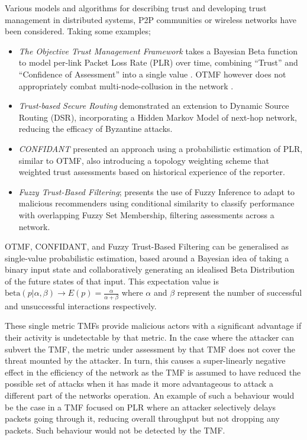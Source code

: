 \documentclass[runningheads,a4paper]{llncs}
\begin{document}
Various models and algorithms for describing trust and developing trust management in distributed systems, P2P communities or wireless networks have been considered.
Taking some examples;

\begin{itemize}
  \item \emph{The Objective Trust Management Framework} takes a Bayesian Beta function to model per-link Packet Loss Rate (PLR) over time, combining ``Trust'' and ``Confidence of Assessment'' into a single value \cite{Li2008}.
    OTMF however does not appropriately combat multi-node-collusion in the network \cite{Cho2011}.
  \item \emph{Trust-based Secure Routing}\cite{Moe2008a} demonstrated an extension to Dynamic Source Routing (DSR), incorporating a Hidden Markov Model of next-hop network, reducing the efficacy of Byzantine attacks.
  \item \emph{CONFIDANT}\cite{Buchegger2002} presented an approach using a probabilistic estimation of PLR, similar to OTMF, also introducing a topology weighting scheme that weighted trust assessments based on historical experience of the reporter.
  \item \emph{Fuzzy Trust-Based Filtering}; \cite{Luo2008} presents the use of Fuzzy Inference to adapt to malicious recommenders using conditional similarity to classify performance with overlapping Fuzzy Set Membership, filtering assessments across a network.
\end{itemize}

OTMF, CONFIDANT, and Fuzzy Trust-Based Filtering can be generalised as single-value probabilistic estimation, based around a Bayesian idea of taking a binary input state and collaboratively generating an idealised Beta Distribution of the future states of that input. This expectation value is $\text{beta}(p|\alpha,\beta) \to E(p) = \frac{\alpha}{\alpha+\beta}$ where $\alpha$ and $\beta$ represent the number of successful and unsuccessful interactions respectively.

These single metric TMFs provide malicious actors with a significant advantage if their activity is undetectable by that metric.
In the case where the attacker can subvert the TMF, the metric under assessment by that TMF does not cover the threat mounted by the attacker.
In turn, this causes a super-linearly negative effect in the efficiency of the network as the TMF is assumed to have reduced the possible set of attacks when it has made it more advantageous to attack a different part of the networks operation.
An example of such a behaviour would be the case in a TMF focused on PLR where an attacker selectively delays packets going through it, reducing overall throughput but not dropping any packets.
Such behaviour would not be detected by the TMF.
\end{document}
